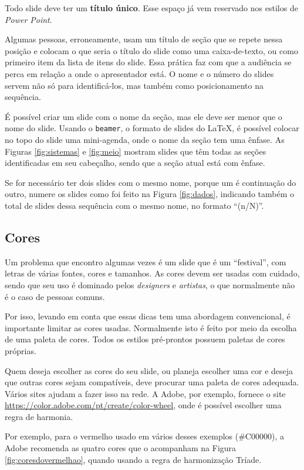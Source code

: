 Todo slide deve ter um \textbf{título único}. Esse espaço já vem reservado nos estilos de \textit{Power Point}.

Algumas pessoas, erroneamente, usam um título de seção que se repete nessa posição e colocam o que seria o título do slide como uma caixa-de-texto, ou como primeiro item da lista de itens do slide. Essa prática faz com que a audiência se perca em relação a onde o apresentador está. O nome e o número do slides servem não só para identificá-los, mas também como posicionamento na sequência.

É possível criar um slide com o nome da seção, mas ele deve ser menor que o nome do slide. Usando o \texttt{beamer}, o formato de slides do \LaTeX, é possível colocar no topo do slide uma mini-agenda, onde o nome da seção tem uma ênfase. As Figuras \ref{fig:sistemas} e \ref{fig:meio} mostram  slides que têm todas as seções identificadas em seu cabeçalho, sendo que a seção atual está com ênfase.

Se for necessário ter dois slides com o mesmo nome, porque um é continuação do outro, numere os slides como foi feito na Figura \ref{fig:dados}, indicando também o total de slides dessa sequência com o mesmo nome, no formato ``(n/N)''.

\subsection{Cores}

Um problema que encontro algumas vezes é um slide que é um ``festival'', com letras de várias fontes, cores e tamanhos. As cores devem ser usadas com cuidado, sendo que seu uso é dominado pelos \textit{designers} e \textit{artistas}, o que normalmente não é o caso de pessoas comuns.

Por isso, levando em conta que essas dicas tem uma abordagem convencional, é importante limitar as cores usadas. Normalmente isto é feito por meio da escolha de uma paleta de cores. Todos os estilos pré-prontos possuem paletas de cores próprias.

Quem deseja escolher as cores do seu slide, ou planeja escolher uma cor e deseja que outras cores sejam compatíveis, deve procurar uma paleta de cores adequada. Vários sites ajudam a fazer isso na rede. A Adobe, por exemplo, fornece o site \url{https://color.adobe.com/pt/create/color-wheel}, onde é possível escolher uma regra de harmonia.

Por exemplo, para o vermelho usado em vários desses exemplos (\#C00000), a Adobe recomenda as quatro cores que o acompanham na Figura \ref{fig:coresdovermelhao}, quando usando a regra de harmonização Tríade.

